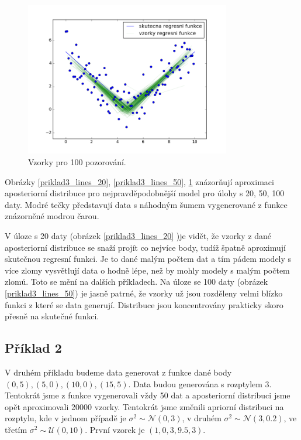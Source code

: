 \documentclass[czech,master,public,dept470,male,cpdeclaration,oneside, python]{diploma}
\begin{document}
\begin{figure}
	[H]\centering\includegraphics[width=0.8\textwidth]{images/priklad3_100n_lines.png}\caption{Vzorky pro 100 pozorování.}\label{priklad3_lines_100}
\end{figure}

Obrázky \ref{priklad3_lines_20}, \ref{priklad3_lines_50}, \ref{priklad3_lines_100} znázorňují aproximaci aposteriorní distribuce pro nejpravděpodobnější model pro úlohy s 20, 50, 100 daty. Modré tečky představují data s náhodným šumem vygenerované z funkce znázorněné modrou čarou.  \par
V úloze s 20 daty (obrázek \ref{priklad3_lines_20} )je  vidět, že vzorky z dané aposteriorní distribuce se snaží projít co nejvíce body, tudíž špatně aproximují skutečnou regresní funkci. Je to dané malým počtem dat a tím pádem modely s více zlomy vysvětlují data o hodně lépe, než by mohly modely s malým počtem zlomů. Toto se mění na dalších příkladech. Na úloze se 100 daty (obrázek \ref{priklad3_lines_50}) je jasně patrné, že vzorky už jsou rozděleny velmi blízko funkci z které se data generují. Distribuce jsou koncentrovány prakticky skoro přesně na skutečné funkci.

\subsection{Příklad 2}
V druhém příkladu budeme data generovat z funkce dané body $(0, 5), (5, 0), (10, 0), (15, 5)$. Data budou generována s rozptylem 3. Tentokrát jsme z funkce vygenerovali vždy 50 dat a aposteriorní distribuci jsme opět aproximovali 20000 vzorky. Tentokrát jsme změnili apriorní distribuci na rozptylu, kde v jednom případě je $\sigma^2 \sim \mathcal{N}(0, 3)$, v druhém $\sigma^2 \sim \mathcal{N}(3, 0.2)$, ve třetím $\sigma^2 \sim \mathcal{U}(0, 10)$.  První vzorek je $(1, 0, 3, 9.5, 3)$. \par
\end{document}
